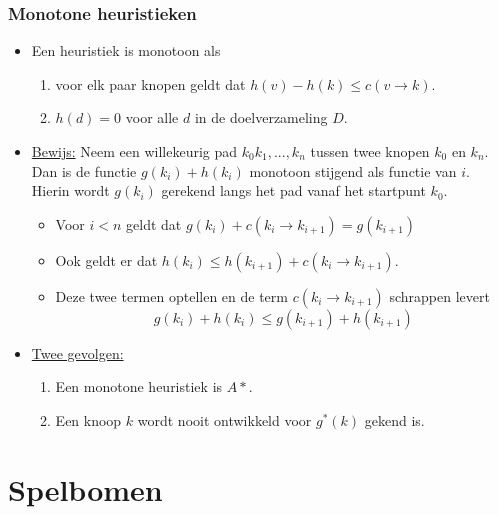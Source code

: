 \subsubsection{Monotone heuristieken}
\begin{itemize}
	\item Een heuristiek is monotoon als 
	\begin{enumerate}
		\item voor elk paar knopen geldt dat $h(v) - h(k) \leq c(v \rightarrow k)$.
		\item $h(d) = 0$ voor alle $d$ in de doelverzameling $D$.
	\end{enumerate}
	\item \underline{Bewijs:} Neem een willekeurig pad $k_0k_1, ...,k_n$ tussen twee knopen $k_0$ en $k_n$. Dan is de functie $g(k_i) + h(k_i)$ monotoon stijgend als functie van $i$. Hierin wordt $g(k_i)$ gerekend langs het pad vanaf het startpunt $k_0$.
	\begin{itemize}
		\item Voor $i < n$ geldt dat $g(k_i) + c(k_i \rightarrow k_{i + 1}) = g(k_{i + 1})$
		\item Ook geldt er dat $h(k_i) \leq h(k_{i + 1}) + c(k_i \rightarrow k_{i + 1})$.
		\item Deze twee termen optellen en de term $c(k_i \rightarrow k_{i + 1})$ schrappen levert 
		$$g(k_i) + h(k_i) \leq g(k_{i + 1}) + h(k_{i + 1})$$
	\end{itemize}
	\item \underline{Twee gevolgen:}
	\begin{enumerate}
		\item Een monotone heuristiek is $A*$.
		\item Een knoop $k$ wordt nooit ontwikkeld voor $g^*(k)$ gekend is.
	\end{enumerate}
\end{itemize}
\section{Spelbomen}